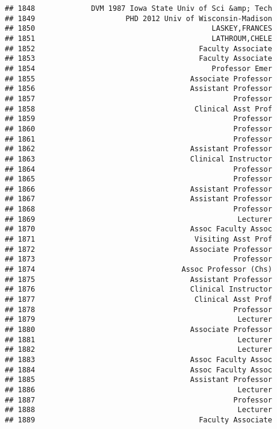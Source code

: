 \documentclass[
]{article}
\begin{document}
\begin{verbatim}
## 1848             DVM 1987 Iowa State Univ of Sci &amp; Tech
## 1849                     PHD 2012 Univ of Wisconsin-Madison
## 1850                                         LASKEY,FRANCES
## 1851                                         LATHROUM,CHELE
## 1852                                      Faculty Associate
## 1853                                      Faculty Associate
## 1854                                         Professor Emer
## 1855                                    Associate Professor
## 1856                                    Assistant Professor
## 1857                                              Professor
## 1858                                     Clinical Asst Prof
## 1859                                              Professor
## 1860                                              Professor
## 1861                                              Professor
## 1862                                    Assistant Professor
## 1863                                    Clinical Instructor
## 1864                                              Professor
## 1865                                              Professor
## 1866                                    Assistant Professor
## 1867                                    Assistant Professor
## 1868                                              Professor
## 1869                                               Lecturer
## 1870                                    Assoc Faculty Assoc
## 1871                                     Visiting Asst Prof
## 1872                                    Associate Professor
## 1873                                              Professor
## 1874                                  Assoc Professor (Chs)
## 1875                                    Assistant Professor
## 1876                                    Clinical Instructor
## 1877                                     Clinical Asst Prof
## 1878                                              Professor
## 1879                                               Lecturer
## 1880                                    Associate Professor
## 1881                                               Lecturer
## 1882                                               Lecturer
## 1883                                    Assoc Faculty Assoc
## 1884                                    Assoc Faculty Assoc
## 1885                                    Assistant Professor
## 1886                                               Lecturer
## 1887                                              Professor
## 1888                                               Lecturer
## 1889                                      Faculty Associate

\end{verbatim}
\end{document}
